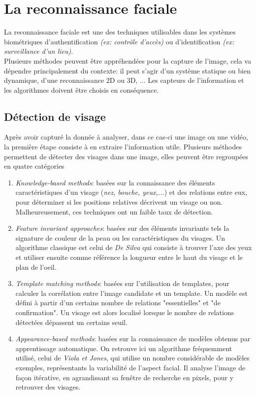 \section{La reconnaissance faciale}
La reconnaissance faciale est une des techniques utilisables dans les systèmes biométriques d'authentification \textit{(ex: contrôle d'accès)} ou d'identification \textit{(ex: surveillance d'un lieu)}.
\\
Plusieurs méthodes peuvent être appréhendées pour la capture de l'image, cela va dépendre principalement du contexte: il peut s'agir d'un système statique ou bien dynamique, d'une reconnaissance 2D ou 3D, ... Les capteurs de l'information et les algorithmes doivent être choisis en conséquence.

\subsection{Détection de visage}
Après avoir capturé la donnée à analyser, dans ce cas-ci une image ou une vidéo, la première étape consiste à en extraire l'information utile. Plusieurs méthodes permettent de détecter des visages dans une image, elles peuvent être regroupées en quatre catégories \cite{Xthesis_1}
\begin{enumerate}
\item \textit{Knowledge-based methods}: basées sur la connaissance des éléments caractéristiques d'un visage (\textit{nez, bouche, yeux,...}) et des relations entre eux, pour déterminer si les positions relatives décrivent un visage ou non. Malheureusement, ces techniques ont un faible taux de détection.
\item \textit{Feature invariant approaches}: basées sur des éléments invariants tels la signature de couleur de la peau ou les caractéristiques du visages. Un algorithme classique est celui de \textit{De Silva} qui consiste à trouver l'axe des yeux et utiliser ensuite comme référence la longueur entre le haut du visage et le plan de l'oeil.
\item \textit{Template matching methods}: basées sur l'utilisation de templates, pour calculer la corrélation entre l'image candidate et un template. Un modèle est défini à partir d'un certains nombre de relations "essentielles" et "de confirmation". Un visage est alors localisé lorsque le nombre de relations détectées dépassent un certains seuil.
\item \textit{Appearance-based methods}: basées sur la connaissance de modèles obtenus par apprentissage automatique. On retrouve ici un algorithme fréquemment utilisé, celui de \textit{Viola et Jones}, qui utilise un nombre considérable de modèles exemples, représentants la variabilité de l'aspect facial. Il analyse l'image de façon itérative, en agrandissant sa fenêtre de recherche en pixels, pour y retrouver des visages.
\end{enumerate}
